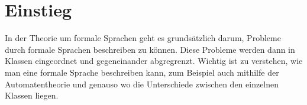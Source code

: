 \chapter{Einstieg}
In der Theorie um formale Sprachen geht es grundsätzlich darum, Probleme durch formale Sprachen beschreiben zu können. Diese Probleme werden dann in Klassen eingeordnet und gegeneinander abgregrenzt. Wichtig ist zu verstehen, wie man eine formale Sprache beschreiben kann, zum Beispiel auch mithilfe der Automatentheorie und genauso wo die Unterschiede zwischen den einzelnen Klassen liegen.

